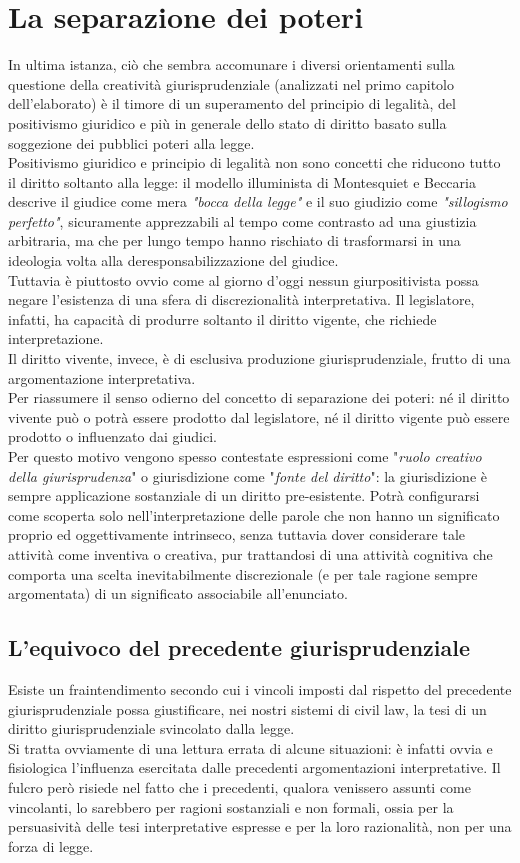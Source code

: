 \section{La separazione dei poteri}
In ultima istanza, ciò che sembra accomunare i diversi orientamenti sulla questione della creatività giurisprudenziale (analizzati nel primo capitolo dell'elaborato) è il timore di un superamento del principio di legalità, del positivismo giuridico e più in generale dello stato di diritto basato sulla soggezione dei pubblici poteri alla legge.
\\Positivismo giuridico e principio di legalità non sono concetti che riducono tutto il diritto soltanto alla legge: il modello illuminista di Montesquiet e Beccaria descrive il giudice come mera \textit{"bocca della legge"} e il suo giudizio come \textit{"sillogismo perfetto"}, sicuramente apprezzabili al tempo come contrasto ad una giustizia arbitraria, ma che per lungo tempo hanno rischiato di trasformarsi in una ideologia volta alla deresponsabilizzazione del giudice.
\\Tuttavia è piuttosto ovvio come al giorno d'oggi nessun giurpositivista possa negare l'esistenza di una sfera di discrezionalità interpretativa.
Il legislatore, infatti, ha capacità di produrre soltanto il diritto vigente, che richiede interpretazione. 
\\Il diritto vivente, invece, è di esclusiva produzione giurisprudenziale, frutto di una argomentazione interpretativa.
\\Per riassumere il senso odierno del concetto di separazione dei poteri: né il diritto vivente può o potrà essere prodotto dal legislatore, né il diritto vigente può essere prodotto o influenzato dai giudici.
\\Per questo motivo vengono spesso contestate espressioni come "\textit{ruolo creativo della giurisprudenza}" o giurisdizione come "\textit{fonte del diritto}": la giurisdizione è sempre applicazione sostanziale di un diritto pre-esistente. Potrà configurarsi come scoperta solo nell'interpretazione delle parole che non hanno un significato proprio ed oggettivamente intrinseco, senza tuttavia dover considerare tale attività come inventiva o creativa, pur trattandosi di una attività cognitiva che comporta una scelta inevitabilmente discrezionale (e per tale ragione sempre argomentata) di un significato associabile all'enunciato.
\subsection{L'equivoco del precedente giurisprudenziale}
Esiste un fraintendimento secondo cui i vincoli imposti dal rispetto del precedente giurisprudenziale possa giustificare, nei nostri sistemi di civil law, la tesi di un diritto giurisprudenziale svincolato dalla legge.
\\Si tratta ovviamente di una lettura errata di alcune situazioni: è infatti ovvia e fisiologica l'influenza esercitata dalle precedenti argomentazioni interpretative.
Il fulcro però risiede nel fatto che i precedenti, qualora venissero assunti come vincolanti, lo sarebbero per ragioni sostanziali e non formali, ossia per la persuasività delle tesi interpretative espresse e per la loro razionalità, non per una forza di legge.

